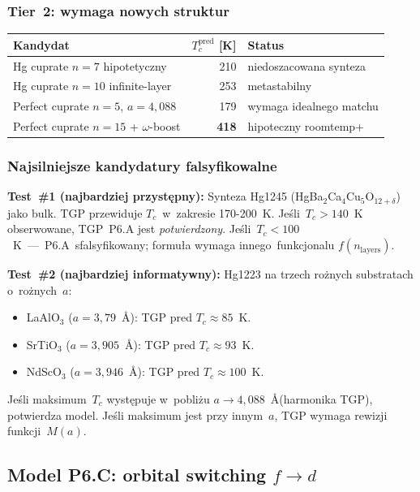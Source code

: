 \subsubsection{Tier~2: wymaga nowych struktur}

\begin{center}
\small
\begin{tabular}{lrl}
\toprule
Kandydat & $T_c^\text{pred}$ [K] & Status \\
\midrule
Hg cuprate $n=7$ hipotetyczny & 210 & niedoszacowana synteza \\
Hg cuprate $n=10$ infinite-layer & 253 & metastabilny \\
Perfect cuprate $n=5$, $a=4{,}088$ & 179 & wymaga idealnego matchu \\
Perfect cuprate $n=15$ + $\omega$-boost & \textbf{418} & hipoteczny roomtemp+ \\
\bottomrule
\end{tabular}
\end{center}

\subsubsection{Najsilniejsze kandydatury falsyfikowalne}

\textbf{Test~\#1 (najbardziej przyst\k{e}pny):}
Synteza Hg1245 (HgBa$_2$Ca$_4$Cu$_5$O$_{12+\delta}$) jako bulk.
TGP przewiduje $T_c$~w~zakresie 170-200~K. Je\'sli~$T_c > 140$~K
obserwowane, TGP~P6.A jest \emph{potwierdzony}.
Je\'sli~$T_c < 100$~K~---~P6.A~sfalsyfikowany; formu\l{}a wymaga
innego~funkcjonalu $f(n_\text{layers})$.

\textbf{Test~\#2 (najbardziej informatywny):}
Hg1223 na trzech ro\.znych substratach o~ro\.znych~$a$:
\begin{itemize}\itemsep0pt
  \item LaAlO$_3$ ($a=3{,}79$~\AA): TGP pred $T_c\approx 85$~K.
  \item SrTiO$_3$ ($a=3{,}905$~\AA): TGP pred $T_c\approx 93$~K.
  \item NdScO$_3$ ($a=3{,}946$~\AA): TGP pred $T_c\approx 100$~K.
\end{itemize}

\noindent Je\'sli maksimum~$T_c$ wyst\k{e}puje w~pobli\.zu
$a\to 4{,}088$~\AA (harmonika TGP), potwierdza model.
Je\'sli maksimum jest przy innym~$a$, TGP wymaga rewizji
funkcji~$M(a)$.

\subsection{Model P6.C: orbital switching $f\!\to\!d$}
\label{sec:P6C}

